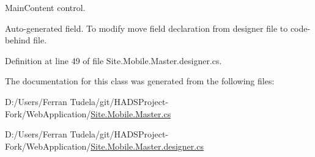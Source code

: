 Main\+Content control. 

Auto-\/generated field. To modify move field declaration from designer file to code-\/behind file. 

Definition at line 49 of file Site.\+Mobile.\+Master.\+designer.\+cs.



The documentation for this class was generated from the following files\+:\begin{DoxyCompactItemize}
\item 
D\+:/\+Users/\+Ferran Tudela/git/\+H\+A\+D\+S\+Project-\/\+Fork/\+Web\+Application/\mbox{\hyperlink{Site_8Mobile_8Master_8cs}{Site.\+Mobile.\+Master.\+cs}}\item 
D\+:/\+Users/\+Ferran Tudela/git/\+H\+A\+D\+S\+Project-\/\+Fork/\+Web\+Application/\mbox{\hyperlink{Site_8Mobile_8Master_8designer_8cs}{Site.\+Mobile.\+Master.\+designer.\+cs}}\end{DoxyCompactItemize}
